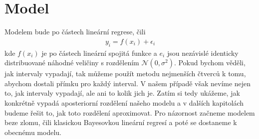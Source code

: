 \documentclass[czech,master,public,dept470,male,cpdeclaration,oneside, python]{diploma}
\begin{document}
%
\section{Model}
Modelem bude po částech lineární regrese, čili
\begin{align}
	y_i = f(x_i) + \epsilon_i
\end{align}
kde $f(x_i)$ je po částech lineární spojitá funkce a $e_i$ jsou nezávislé identicky distribuované náhodné veličiny s rozdělením $\mathcal{N}(0, \sigma^2)$. Pokud bychom věděli, jak intervaly vypadají, tak můžeme použít metodu nejmenších čtverců k tomu, abychom dostali přímku pro každý interval. V našem případě však nevíme nejen to, jak intervaly vypadají, ale ani to kolik jich je. Zatím si tedy ukážeme, jak konkrétně vypadá aposteriorní rozdělení našeho modelu a v dalších kapitolách budeme řešit to, jak toto rozdělení aproximovat. Pro názornost začneme modelem beze zlomu, čili klasickou Bayesovkou lineární regresí a poté se dostaneme k obecnému modelu. 
\end{document}
